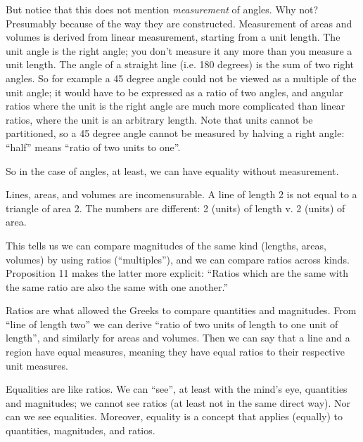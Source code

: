\documentclass{article}
\begin{document}
But notice that this does not mention \textit{measurement} of angles.
Why not? Presumably because of the way they are constructed.
Measurement of areas and volumes is derived from linear measurement,
starting from a unit length. The unit angle is the right angle; you
don't measure it any more than you measure a unit length. The angle of
a straight line (i.e. 180 degrees) is the sum of two right angles. So
for example a 45 degree angle could not be viewed as a multiple of the
unit angle; it would have to be expressed as a ratio of two angles,
and angular ratios where the unit is the right angle are much more
complicated than linear ratios, where the unit is an arbitrary length.
Note that units cannot be partitioned, so a 45 degree angle cannot be
measured by halving a right angle: ``half'' means ``ratio of two units
to one''.

So in the case of angles, at least, we can have equality without measurement.


Lines, areas, and volumes are incomensurable. A line of length 2 is
not equal to a triangle of area 2. The numbers are different: 2
(units) of length v. 2 (units) of area.


This tells us we can compare magnitudes of the same kind (lengths,
areas, volumes) by using ratios (``multiples''), and we can compare
ratios across kinds. Proposition 11 makes the latter more explicit:
\enquote{Ratios which are the same with the same ratio are also the
  same with one another.}

Ratios are what allowed the Greeks to compare quantities and
magnitudes. From ``line of length two'' we can derive ``ratio of two
units of length to one unit of length'', and similarly for areas and
volumes. Then we can say that a line and a region have equal measures,
meaning they have equal ratios to their respective unit measures.

Equalities are like ratios. We can ``see'', at least with the mind's
eye, quantities and magnitudes; we cannot see ratios (at least not in
the same direct way). Nor can we see equalities. Moreover, equality is
a concept that applies (equally) to quantities, magnitudes, and
ratios.

 \parencite{euclid}
\end{document}
